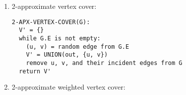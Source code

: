 \begin{enumerate}
\item 2-approximate vertex cover:
\begin{verbatim}
2-APX-VERTEX-COVER(G):
  V' = {}
  while G.E is not empty:
    (u, v) = random edge from G.E
    V' = UNION(out, {u, v})
    remove u, v, and their incident edges from G
  return V'
\end{verbatim}

\item 2-approximate weighted vertex cover:


\end{enumerate}
